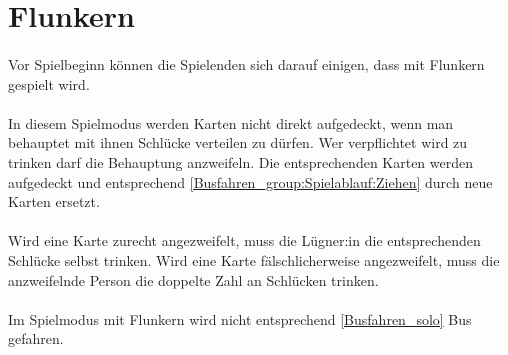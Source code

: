 \section{Flunkern}
\paragraph{}
Vor Spielbeginn können die Spielenden sich darauf einigen, dass mit Flunkern gespielt wird.

\paragraph{}
In diesem Spielmodus werden Karten nicht direkt aufgedeckt, wenn man behauptet mit ihnen Schlücke verteilen zu dürfen.
Wer verpflichtet wird zu trinken darf die Behauptung anzweifeln.
Die entsprechenden Karten werden aufgedeckt und entsprechend \ref{Busfahren_group:Spielablauf:Ziehen} durch neue Karten ersetzt.

\paragraph{}
Wird eine Karte zurecht angezweifelt, muss die Lügner:in die entsprechenden Schlücke selbst trinken.
Wird eine Karte fälschlicherweise angezweifelt, muss die anzweifelnde Person die doppelte Zahl an Schlücken trinken.

\paragraph{}
Im Spielmodus mit Flunkern wird nicht entsprechend \ref{Busfahren_solo} Bus gefahren.
